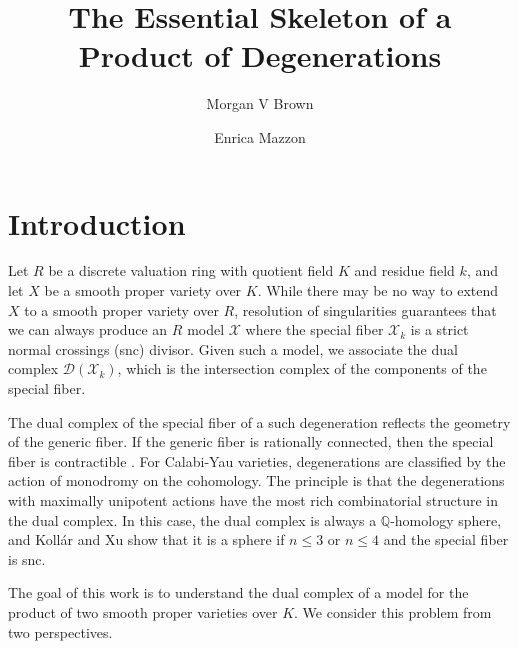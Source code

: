 \documentclass{amsart}%
\title{The Essential Skeleton of a Product of Degenerations}
\author{Morgan V Brown}
\author{Enrica Mazzon}
\date{}
\numberwithin{equation}{subsection}
\theoremstyle{plain2}
\theoremstyle{definition2}
\theoremstyle{stepstyle}
\theoremstyle{point}
\theoremstyle{subpoint}
\newcommand{\D}{{\mathcal D}}
\newcommand{\cX}{\ensuremath{\mathscr{X}}}
\newcommand{\Hilb}{\ensuremath{\mathrm{Hilb}}}
\newcommand{\an}{\mathrm{an}}
\begin{document}
\maketitle

%


\section{Introduction}

Let $R$ be a discrete valuation ring with quotient field $K$ and residue field $k$, and let $X$ be a smooth proper variety over $K$. While there may be no way to extend $X$ to a smooth proper variety over $R$, resolution of singularities guarantees that we can always produce an $R$ model $\cX$ where the special fiber $\cX_k$ is a strict normal crossings (snc) divisor. Given such a model, we associate the dual complex $\D(\cX_k)$, which is the intersection complex of the components of the special fiber. 

The dual complex of the special fiber of a such degeneration reflects the geometry of the generic fiber. If the generic fiber is rationally connected, then the special fiber is contractible \cite{deFernexKollarXu2012}. For Calabi-Yau varieties, degenerations are classified by the action of monodromy on the cohomology. The principle is that the degenerations with maximally unipotent actions have the most rich combinatorial structure in the dual complex. In this case, the dual complex is always a $\mathbb{Q}$-homology sphere, and Koll{\'a}r and Xu \cite{KollarXu} show that it is a sphere if $n\leqslant 3$ or $n \leqslant 4$ and the special fiber is snc. 

The goal of this work is to understand the dual complex of a model for the product of two smooth proper varieties over $K$. We consider this problem from two perspectives.
\end{document}
